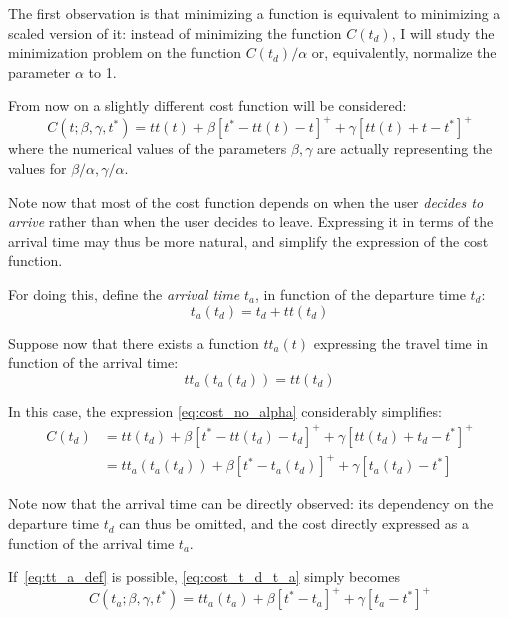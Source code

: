 The first observation is that minimizing a function is equivalent to minimizing a scaled version of it:
instead of minimizing the function \(C(t_d)\),
I will study the minimization problem on the function \(C(t_d)/\alpha\) or,
equivalently, normalize the parameter \(\alpha\) to 1.

From now on a slightly different cost function will be considered:
\begin{equation}
  \label{eq:cost_no_alpha}
  C(t; \beta, \gamma, t^*) = tt(t) + \beta [t^* - tt(t) - t]^+ + \gamma[tt(t) + t - t^*]^+
\end{equation}
where the numerical values of the parameters \(\beta, \gamma\) are actually representing the values for \(\beta/\alpha, \gamma/\alpha\).

Note now that most of the cost function depends on when the user \textit{decides to arrive} rather than when the user decides to leave.
Expressing it in terms of the arrival time may thus be more natural,
and simplify the expression of the cost function.

For doing this, define the \textit{arrival time} \(t_a\), in function of the departure time \(t_d\):
\[t_a(t_d) = t_d + tt(t_d)\]

Suppose now that there exists a function \(tt_a(t)\) expressing the travel time in function of the arrival time:
\begin{equation}
  \label{eq:tt_a_def}
  tt_a(t_a(t_d)) = tt(t_d)
\end{equation}

In this case, the expression \eqref{eq:cost_no_alpha} considerably simplifies:
\begin{equation}
  \label{eq:cost_t_d_t_a}
  \begin{split}
    C(t_d) & = tt(t_d) + \beta [t^* - tt(t_d) - t_d]^+ + \gamma[tt(t_d) + t_d - t^*]^+ \\
           & = tt_a(t_a(t_d)) + \beta [t^* - t_a(t_d)]^+ + \gamma [t_a(t_d) - t^*]
  \end{split}
\end{equation}

Note now that the arrival time can be directly observed:
its dependency on the departure time \(t_d\) can thus be omitted,
and the cost directly expressed as a function of the arrival time \(t_a\).

If~\eqref{eq:tt_a_def} is possible, \eqref{eq:cost_t_d_t_a} simply becomes
\begin{equation}
  \label{eq:cost_simplified}
  C(t_a; \beta, \gamma, t^*) = tt_a(t_a) + \beta [t^* - t_a]^+ + \gamma [t_a - t^*]^+
\end{equation}

